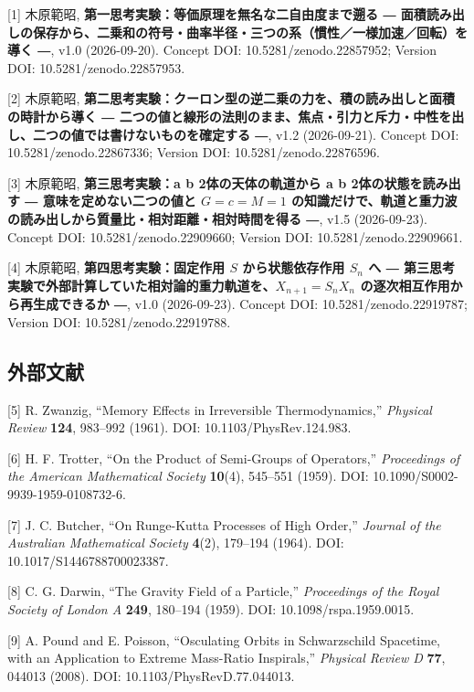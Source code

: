 \documentclass[
  a4paper,
]{ltjsarticle}
\begin{document}
{[}1{]} 木原範昭, \textbf{第一思考実験：等価原理を無名な二自由度まで遡る
―
面積読み出しの保存から、二乗和の符号・曲率半径・三つの系（慣性／一様加速／回転）を導く
―}, v1.0 (2026-09-20). Concept DOI: 10.5281/zenodo.22857952; Version
DOI: 10.5281/zenodo.22857953.

{[}2{]} 木原範昭,
\textbf{第二思考実験：クーロン型の逆二乗の力を、積の読み出しと面積の時計から導く
―
二つの値と線形の法則のまま、焦点・引力と斥力・中性を出し、二つの値では書けないものを確定する
―}, v1.2 (2026-09-21). Concept DOI: 10.5281/zenodo.22867336; Version
DOI: 10.5281/zenodo.22876596.

{[}3{]} 木原範昭, \textbf{第三思考実験：a b 2体の天体の軌道から a b
2体の状態を読み出す ― 意味を定めない二つの値と \(G=c=M=1\)
の知識だけで、軌道と重力波の読み出しから質量比・相対距離・相対時間を得る
―}, v1.5 (2026-09-23). Concept DOI: 10.5281/zenodo.22909660; Version
DOI: 10.5281/zenodo.22909661.

{[}4{]} 木原範昭, \textbf{第四思考実験：固定作用 \(S\) から状態依存作用
\(S_n\) へ ―
第三思考実験で外部計算していた相対論的重力軌道を、\(X_{n+1}=S_nX_n\)
の逐次相互作用から再生成できるか ―}, v1.0 (2026-09-23). Concept DOI:
10.5281/zenodo.22919787; Version DOI: 10.5281/zenodo.22919788.

\subsection{外部文献}\label{ux5916ux90e8ux6587ux732e}

{[}5{]} R. Zwanzig, ``Memory Effects in Irreversible Thermodynamics,''
\emph{Physical Review} \textbf{124}, 983--992 (1961). DOI:
10.1103/PhysRev.124.983.

{[}6{]} H. F. Trotter, ``On the Product of Semi-Groups of Operators,''
\emph{Proceedings of the American Mathematical Society} \textbf{10}(4),
545--551 (1959). DOI: 10.1090/S0002-9939-1959-0108732-6.

{[}7{]} J. C. Butcher, ``On Runge-Kutta Processes of High Order,''
\emph{Journal of the Australian Mathematical Society} \textbf{4}(2),
179--194 (1964). DOI: 10.1017/S1446788700023387.

{[}8{]} C. G. Darwin, ``The Gravity Field of a Particle,''
\emph{Proceedings of the Royal Society of London A} \textbf{249},
180--194 (1959). DOI: 10.1098/rspa.1959.0015.

{[}9{]} A. Pound and E. Poisson, ``Osculating Orbits in Schwarzschild
Spacetime, with an Application to Extreme Mass-Ratio Inspirals,''
\emph{Physical Review D} \textbf{77}, 044013 (2008). DOI:
10.1103/PhysRevD.77.044013.
\end{document}
